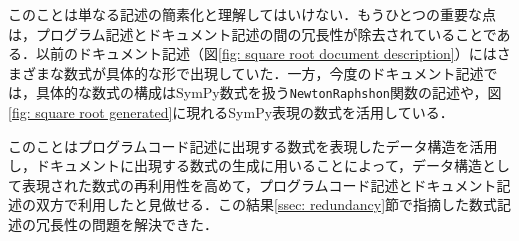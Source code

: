 このことは単なる記述の簡素化と理解してはいけない．もうひとつの重要な点は，プログラム記述とドキュメント記述の間の冗長性が除去されていることである．以前のドキュメント記述（図\ref {fig: square root document description}）にはさまざまな数式が具体的な形で出現していた．一方，今度のドキュメント記述では，具体的な数式の構成はSymPy数式を扱う\verb|NewtonRaphshon|関数の記述や，図\ref {fig: square root generated}に現れるSymPy表現の数式を活用している．

このことはプログラムコード記述に出現する数式を表現したデータ構造を活用し，ドキュメントに出現する数式の生成に用いることによって，データ構造として表現された数式の再利用性を高めて，プログラムコード記述とドキュメント記述の双方で利用したと見做せる．この結果\ref {ssec: redundancy}節で指摘した数式記述の冗長性の問題を解決できた．
